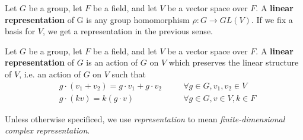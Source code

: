\begin{defn}
\label{rep-def-1}
Let $G$ be a group, let $F$ be a field, and let $V$ be a vector space over $F$.  A \textbf{linear representation} of G is any group homomorphism $\rho\colon G \to GL(V)$. If we fix a basis for $V$, we get a representation in the previous sense.\end{defn}
 



\begin{defn} \label{rep-def-2}Let $G$ be a group, let $F$ be a field, and let $V$ be a vector space over $F$. A \textbf{linear representation} of $G$ is an action of $G$ on $V$ which preserves the linear structure of $V$, i.e. an action of $G$ on $V$ such that
\begin{align}
\label{rep-axiom-1}&g \cdot (v_1+v_2)=g \cdot v_1+g \cdot v_2 \quad && \forall g \in G, v_1, v_2 \in V \\
\label{rep-axiom-2}&g \cdot (kv) = k (g \cdot v) \quad && \forall g \in G, v \in V, k \in F
\end{align}
 \end{defn}
 
 \begin{note}
 Unless otherwise specificed, we use \textit{representation} to mean \textit{finite-dimensional complex representation}.
 \end{note}
 
